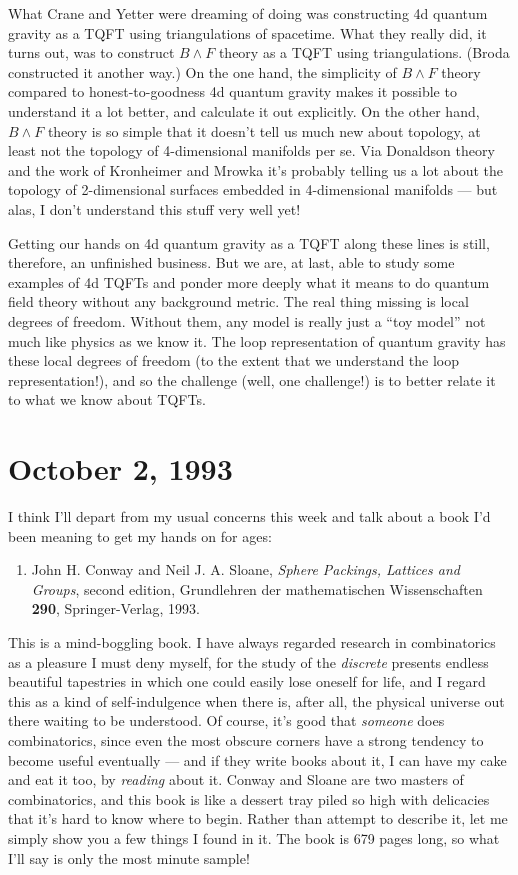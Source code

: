 \documentclass{article}
\def\tightlist{}
\begin{document}
What Crane and Yetter were dreaming of doing was constructing 4d quantum
gravity as a TQFT using triangulations of spacetime. What they really
did, it turns out, was to construct \(B\wedge F\) theory as a TQFT using
triangulations. (Broda constructed it another way.) On the one hand, the
simplicity of \(B\wedge F\) theory compared to honest-to-goodness 4d
quantum gravity makes it possible to understand it a lot better, and
calculate it out explicitly. On the other hand, \(B\wedge F\) theory is
so simple that it doesn't tell us much new about topology, at least not
the topology of 4-dimensional manifolds per se. Via Donaldson theory and
the work of Kronheimer and Mrowka it's probably telling us a lot about
the topology of 2-dimensional surfaces embedded in 4-dimensional
manifolds --- but alas, I don't understand this stuff very well yet!

Getting our hands on 4d quantum gravity as a TQFT along these lines is
still, therefore, an unfinished business. But we are, at last, able to
study some examples of 4d TQFTs and ponder more deeply what it means to
do quantum field theory without any background metric. The real thing
missing is local degrees of freedom. Without them, any model is really
just a ``toy model'' not much like physics as we know it. The loop
representation of quantum gravity has these local degrees of freedom (to
the extent that we understand the loop representation!), and so the
challenge (well, one challenge!) is to better relate it to what we know
about TQFTs.
\hypertarget{week20}{%
\section{October 2, 1993}\label{week20}}

I think I'll depart from my usual concerns this week and talk about a
book I'd been meaning to get my hands on for ages:

\begin{enumerate}
\def\labelenumi{\arabic{enumi})}
\tightlist
\item
  John H. Conway and Neil J. A. Sloane, \emph{Sphere Packings, Lattices
  and Groups}, second edition, Grundlehren der mathematischen
  Wissenschaften \textbf{290}, Springer-Verlag, 1993.
\end{enumerate}

This is a mind-boggling book. I have always regarded research in
combinatorics as a pleasure I must deny myself, for the study of the
\emph{discrete} presents endless beautiful tapestries in which one could
easily lose oneself for life, and I regard this as a kind of
self-indulgence when there is, after all, the physical universe out
there waiting to be understood. Of course, it's good that \emph{someone}
does combinatorics, since even the most obscure corners have a strong
tendency to become useful eventually --- and if they write books about
it, I can have my cake and eat it too, by \emph{reading} about it.
Conway and Sloane are two masters of combinatorics, and this book is
like a dessert tray piled so high with delicacies that it's hard to know
where to begin. Rather than attempt to describe it, let me simply show
you a few things I found in it. The book is 679 pages long, so what I'll
say is only the most minute sample!
\end{document}
